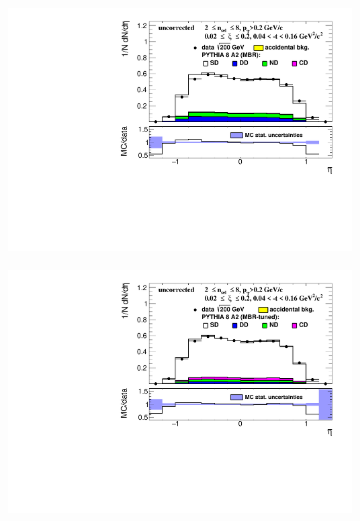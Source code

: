 \begin{figure}[h!]
	\centering
	\begin{subfigure}{.45\textwidth}
		\includegraphics[width=\linewidth, page=1]{chapters/chrgSTAR/img/nonSD/chrg/SDT_pythia_xi0_RP_starsim_eta.pdf}
	\end{subfigure}
	\begin{subfigure}{.45\textwidth}
		\includegraphics[width=\linewidth, page=1]{chapters/chrgSTAR/img/nonSD/chrg/SDT_pythia_xi0_option2_RP_starsim_eta.pdf}
	\end{subfigure}
	\begin{subfigure}{.45\textwidth}

\end{subfigure}
\end{figure}
